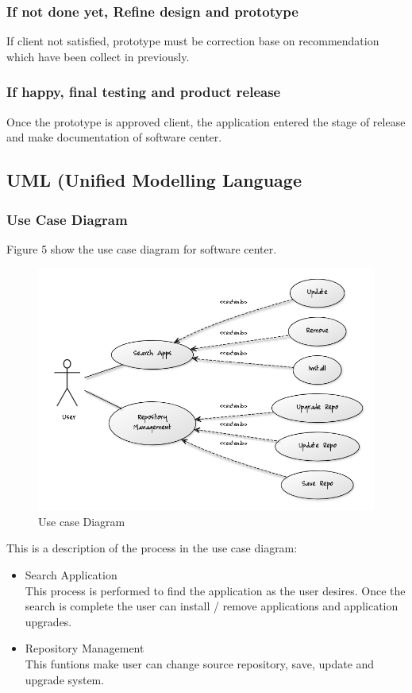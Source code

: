 \documentclass[conference, letterpaper]{IEEEtran}
\begin{document}
\subsubsection{If not done yet, Refine design and prototype}
If client not satisfied, prototype must be correction base on recommendation which have been collect in previously.

\subsubsection{If happy, final testing and product release}
Once the prototype is approved client, the application entered the stage of release and make documentation of software center. 

\subsection{UML (Unified Modelling Language}

\subsubsection{Use Case Diagram}
Figure 5 show the use case diagram for software center.

\begin{figure}[!t]
\centering
\includegraphics[scale=0.42]{image/Usecase.png}
\caption{Use case Diagram}
\end{figure}

This is a description of the process in the use case diagram:
\begin{itemize}
\item Search Application\\
This process is performed to find the application as the user desires. Once the search is complete the user can install / remove applications and application upgrades.
\item Repository Management\\
This funtions make user can change source repository, save, update and upgrade system.
\end{itemize}
\end{document}
